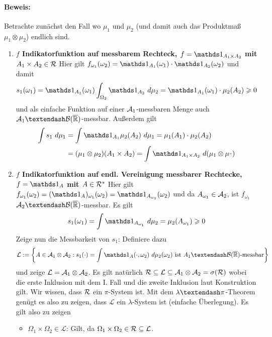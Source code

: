 \paragraph{Beweis:}Betrachte zun\"achst den Fall wo $\mu_1$ und $\mu_2$ (und damit auch das Produktma\ss{} $\mu_1\otimes\mu_2$) endlich sind.
\begin{enumerate}[label=\Roman*.]
    \item \textbf{$f$ Indikatorfunktion auf messbarem Rechteck, $f=\ind{A_1\times A_2}$ mit $A_1\times A_2\in\mathcal{R}$}\newline
    Hier gilt $f_{\omega_1}(\omega_2)=\ind{A_1}(\omega_1)\cdot\ind{A_2}(\omega_2)$ und damit 
    $$s_1(\omega_1)=\ind{A_1}(\omega_1)\int_{\Omega_2}\ind{A_2}\ d\mu_2=\ind{A_1}(\omega_1)\cdot\mu_2(A_2)\geq0$$
    und als einfache Funktion auf einer $\mathcal{A}_1$-messbaren Menge auch $\A_1\textendash\mathcal{B}(\overline\R)$-messbar. Au\ss{}erdem gilt
    \begin{align*}
        \int s_1\ d\mu_1&=\int\ind{A_1}\mu_2(A_2)\ d\mu_1=\mu_1(A_1)\cdot\mu_2(A_2)\\
        &=(\mu_1\otimes\mu_2)(A_1\times A_2)=\int\ind{A_1\times A_2}\ d(\mu_1\otimes\mu_")
    \end{align*}
    \item \textbf{$f$ Indikatorfunktion auf endl. Vereinigung messbarer Rechtecke, $f=\ind{A}$ mit $A\in\mathcal{R}^*$}\newline
    Hier gilt $f_{\omega_1}(\omega_2)=(\ind{A})_{\omega_1}(\omega_2)=\ind{A_{\omega_1}}(\omega_2)$ und da $A_{\omega_1}\in\mathcal{A}_2$, ist $f_{\omega_1}$ $\A_2\textendash\mathcal{B}(\overline\R)$-messbar. Es gilt
    $$s_1(\omega_1)=\int\ind{A_{\omega_1}}\ d\mu_2=\mu_2(A_{\omega_1})\geq0$$
    Zeige nun die Messbarkeit von $s_1$: Definiere dazu
    $$\mathcal{L}:=\left\{A\in\A_1\otimes\A_2:s_1(\cdot)=\int\ind{A}(\cdot,\omega_2)\ d\mu_2(\omega_2) \text{ ist }A_1\textendash\mathcal{B}(\overline\R)\text{-messbar}\right\}$$
    und zeige $\mathcal{L}=\mathcal{A}_1\otimes\mathcal{A}_2$. Es gilt nat\"urlich $\mathcal{R}\subseteq\mathcal{L}\subseteq\mathcal{A}_1\otimes\mathcal{A}_2=\sigma(\mathcal{R})$
    wobei die erste Inklusion mit dem I. Fall und die zweite Inklusion laut Konstruktion gilt. Wir wissen, dass $\mathcal{R}$ ein $\pi$-System ist. Mit dem $\lambda\textendash\pi$-Theorem gen\"ugt es also zu zeigen, dass $\mathcal{L}$ ein $\lambda$-System ist (einfache \"Uberlegung). Es gilt also zu zeigen
    \begin{itemize}
        \item $\Omega_1\times\Omega_2\in\mathcal{L}$: Gilt, da $\Omega_1\times\Omega_2\in\mathcal{R}\subseteq\mathcal{L}$.

\end{itemize}
\end{enumerate}
